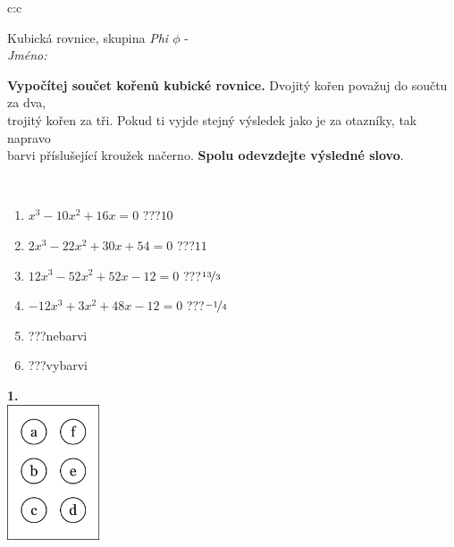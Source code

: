 \documentclass[10pt]{report}
\begin{document}
\begin{tabular}{c:c}
\begin{minipage}[c][104.5mm][t]{0.5\linewidth}
\begin{center}
\vspace{7mm}
{\huge Kubická rovnice, skupina \textit{Phi $\phi$} -}\\[5mm]
\textit{Jméno:}\phantom{xxxxxxxxxxxxxxxxxxxxxxxxxxxxxxxxxxxxxxxxxxxxxxxxxxxxxxxxxxxxxxxxx}\\[5mm]
\begin{minipage}{0.95\linewidth}
\begin{center}
\textbf{Vypočítej součet kořenů kubické rovnice.} Dvojitý kořen považuj do součtu za dva,\\trojitý kořen za tři. Pokud ti vyjde stejný výsledek jako je za otazníky, tak napravo\\barvi příslušející kroužek načerno. \textbf{Spolu odevzdejte výsledné slovo}.
\end{center}
\end{minipage}
\\[1mm]
\begin{minipage}{0.79\linewidth}
\begin{center}
\begin{varwidth}{\linewidth}
\begin{enumerate}
\Large
\item $x^3-10x^2+16x=0$\quad \dotfill\; ???\;\dotfill \quad $10$
\item $2x^3-22x^2+30x+54=0$\quad \dotfill\; ???\;\dotfill \quad $11$
\item $12x^3-52x^2+52x-12=0$\quad \dotfill\; ???\;\dotfill \quad $\nicefrac{13}{3}$
\item $-12x^3+3x^2+48x-12=0$\quad \dotfill\; ???\;\dotfill \quad $\nicefrac{-1}{4}$
\item \quad \dotfill\; ???\;\dotfill \quad nebarvi
\item \quad \dotfill\; ???\;\dotfill \quad vybarvi
\end{enumerate}
\end{varwidth}
\end{center}
\end{minipage}
\begin{minipage}{0.20\linewidth}
\begin{center}
{\Huge\bfseries 1.} \\[2mm]
\includegraphics[height=40mm]{../images/braille.png}

\end{center}
\end{minipage}
\end{center}
\end{minipage}
\end{tabular}
\end{document}
